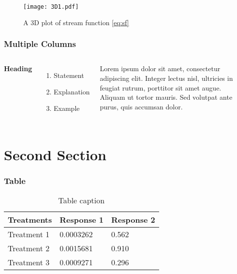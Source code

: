 \documentclass{beamer}
\begin{document}
\begin{frame}
\frametitle{}
\begin{figure}[!htb]
\centering
\texttt{[image: 3D1.pdf]}
 \caption{ A 3D plot of stream function \ref{eq:sf}}
 \label{fig:kme3d}
\end{figure}
\end{frame}


\begin{frame}
\frametitle{Multiple Columns}
\begin{columns}[c] %

\textbf{Heading}
\begin{enumerate}
\item Statement
\item Explanation
\item Example
\end{enumerate}

Lorem ipsum dolor sit amet, consectetur adipiscing elit. Integer lectus nisl, ultricies in feugiat rutrum, porttitor sit amet augue. Aliquam ut tortor mauris. Sed volutpat ante purus, quis accumsan dolor.

\end{columns}
\end{frame}

\section{Second Section}

\begin{frame}
\frametitle{Table}
\begin{table}
\begin{tabular}{l l l}
\toprule
\textbf{Treatments} & \textbf{Response 1} & \textbf{Response 2}\\
\midrule
Treatment 1 & 0.0003262 & 0.562 \\
Treatment 2 & 0.0015681 & 0.910 \\
Treatment 3 & 0.0009271 & 0.296 \\
\bottomrule
\end{tabular}
\caption{Table caption}
\end{table}
\end{frame}
\end{document}
